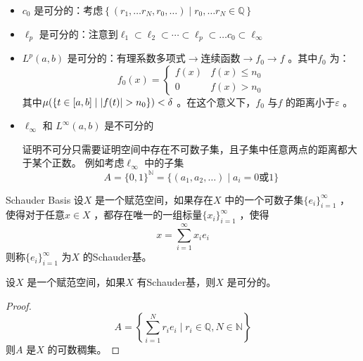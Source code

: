 \begin{example}{}
    \begin{itemize}
        \item \(c_{0}\) 是可分的：考虑\(\left\{ (r_{1},\dots r_{N}, r_{0},
            \dots ) \mid r_{0},\dots r_{N} \in \mathbb{Q} \right\}\)
        \item \(\ell_{p}\) 是可分的：注意到\(\ell_{1} \subset \ell_{2}
                \subset \cdots \subset \ell_{p} \subset \dots c_{0}
            \subset \ell_{\infty}\)
        \item \(L^{p}(a,b)\) 是可分的：\(\text{有理系数多项式} \to \text{连续函数}
            \to f_{0} \to f\) 。其中\(f_{0}\) 为：\[
                f_{0}(x) =
                \begin{cases}
                    f(x) & f(x) \leq n_{0}\\
                    0 & f(x) > n_{0}
                \end{cases}
            \]
            其中\(\mu(\left\{ t \in [a,b] \mid \left|f(t)\right| > n_{0}
            \right\})< \delta\) 。在这个意义下，\(f_{0}\) 与\(f\) 的距离小于\(\varepsilon\) 。
        \item \(\ell_{\infty}\) 和 \(L^{\infty}(a,b)\) 是不可分的

            证明不可分只需要证明空间中存在不可数子集，且子集中任意两点的距离都大于某个正数。
            例如考虑\(\ell_{\infty}\) 中的子集\[
                A = \{0,1\}^{\mathbb{N}} = \{ (a_{1},a_{2},\ldots)
                \mid a_{i} = 0 \text{或} 1 \}
            \]
    \end{itemize}
\end{example}

\begin{definition}{Schauder Basis}
    设\(X\) 是一个赋范空间，如果存在\(X\) 中的一个可数子集\(\{e_{i}\}_{i=1}^{\infty}\) ，
    使得对于任意\(x \in X\) ，都存在唯一的一组标量\(\{x_{i}\}_{i=1}^{\infty}\) ，使得
    \[
        x = \sum_{i=1}^{\infty} x_{i} e_{i}
    \]
    则称\(\{e_{i}\}_{i=1}^{\infty}\) 为\(X\) 的Schauder基。
\end{definition}

\begin{theorem}{}
    设\(X\) 是一个赋范空间，如果\(X\) 有Schauder基，则\(X\) 是可分的。
\end{theorem}

\begin{proof}
    \[
        A = \left\{ \sum_{i=1}^{N} r_{i} e_{i} \mid r_{i} \in
        \mathbb{Q}, N \in \mathbb{N} \right\}
    \]
    则\(A\) 是\(X\) 的可数稠集。
\end{proof}